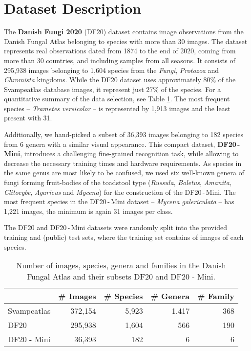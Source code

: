 \documentclass[10pt,twocolumn,letterpaper]{article}
\begin{document}
\section{Dataset Description}

The \textbf{Danish Fungi 2020} (DF20) dataset contains image observations from the Danish Fungal Atlas belonging to species with more than 30 images. 
The dataset represents real observations dated from 1874 to the end of 2020, coming from more than 30 countries, and  including samples from all seasons. It consists of 295,938 images belonging to 1,604 species from the \textit{Fungi}, \textit{Protozoa} and \textit{Chromista} kingdoms. While the DF20 dataset uses approximately 80\% of the Svampeatlas database images, it represent just 27\% of the species. For a quantitative summary of the data selection, see Table \ref{table:dataset_stats}.
The most frequent species -- \textit{Trametes versicolor} -- is represented by 1,913 images and the least present with 31.

Additionally, we hand-picked a subset of 36,393 images belonging to 182 species from 6 genera with a similar visual appearance. This compact dataset, \textbf{DF20\,-\,Mini}, introduces a challenging fine-grained recognition task, while allowing to decrease the necessary training times and hardware requirements.
As species in the same genus are most likely to be confused, we used six well-known genera of fungi forming fruit-bodies of the toadstool type (\textit{Russula}, \textit{Boletus}, \textit{Amanita}, \textit{Clitocybe}, \textit{Agaricus} and \textit{Mycena}) for the construction of the DF20\,-\,Mini. The most frequent species in the DF20\,-\,Mini dataset -- \textit{Mycena galericulata} -- has 1,221 images, the minimum is again 31 images per class. 

The DF20 and DF20\,-\,Mini datasets were randomly split into the provided training and (public) test sets, where the training set contains  of images of each species.

\begin{table}[t]
\setlength{\tabcolsep}{0.325em}
\renewcommand{\arraystretch}{1.1}
\begin{center}
\begin{tabular}{|l|r|r|r|r|}
\cline{2-5}
\multicolumn{1}{l|}{ } & \multicolumn{1}{c|}{\# Images} &  \multicolumn{1}{c|}{\# Species} & \multicolumn{1}{c|}{\# Genera} & \multicolumn{1}{c|}{\# Family} \\
\hline
Svampeatlas   & 372,154 & 5,923 & 1,417 & 368 \\
DF20           & 295,938 & 1,604 &   566 & 190 \\
DF20 - Mini    &  36,393 &   182 &     6 &   6 \\
\hline
\end{tabular}
\end{center}
\caption{Number of images, species, genera and families in the Danish Fungal Atlas and their subsets DF20 and DF20 - Mini.}
\label{table:dataset_stats}
\end{table}
\end{document}
